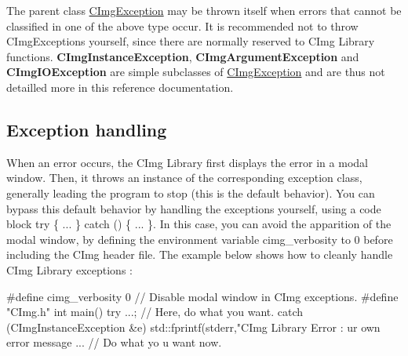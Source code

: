 The parent class \hyperlink{structcimg__library_1_1CImgException}{CImgException} may be thrown itself when errors that cannot be classified in one of the above type occur. It is recommended not to throw CImgExceptions yourself, since there are normally reserved to CImg Library functions. {\bfseries CImgInstanceException}, {\bfseries CImgArgumentException} and {\bfseries CImgIOException} are simple subclasses of \hyperlink{structcimg__library_1_1CImgException}{CImgException} and are thus not detailled more in this reference documentation.\hypertarget{structcimg__library_1_1CImgException_ex2}{}\subsection{Exception handling}\label{structcimg__library_1_1CImgException_ex2}
When an error occurs, the CImg Library first displays the error in a modal window. Then, it throws an instance of the corresponding exception class, generally leading the program to stop (this is the default behavior). You can bypass this default behavior by handling the exceptions yourself, using a code block {\ttfamily try \{ ... \} catch () \{ ... \}}. In this case, you can avoid the apparition of the modal window, by defining the environment variable {\ttfamily cimg\_\-verbosity} to 0 before including the CImg header file. The example below shows how to cleanly handle CImg Library exceptions : 
\begin{DoxyCode}
      #define cimg_verbosity 0     // Disable modal window in CImg exceptions.
      #define "CImg.h"
      int main() {
        try {
          ...; // Here, do what you want.
        }
        catch (CImgInstanceException &e) {
          std::fprintf(stderr,"CImg Library Error : %
      ur own error message
          ...                                                       // Do what yo
      u want now.
        }
      }
\end{DoxyCode}
 